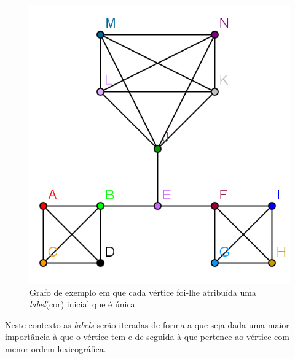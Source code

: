   \begin{figure}[H]
    \center
    \includegraphics{graph_step0.png}
    \caption{Grafo de exemplo em que cada vértice foi-lhe atribuída uma \textit{label}(cor) inicial que é única.}
    \label{graph0llp}
  \end{figure}
  
  Neste contexto as \textit{labels} serão iteradas de forma a que seja dada uma maior importância à que o vértice tem e de seguida à que pertence ao vértice com menor ordem lexicográfica.

